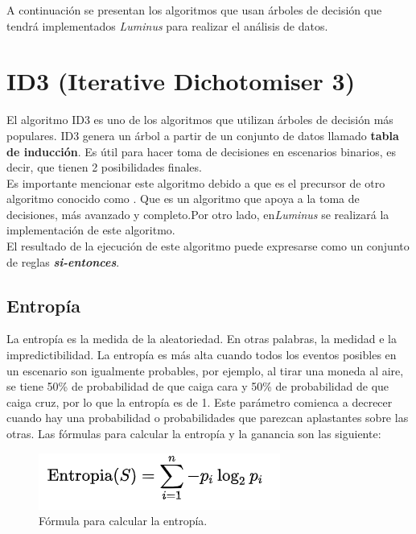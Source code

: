 A continuación se presentan los algoritmos que usan árboles de decisión que tendrá implementados \emph{Luminus} para realizar el análisis de datos.

\section{ID3 (Iterative Dichotomiser 3)} \label{id3}

El algoritmo ID3 es uno de los algoritmos que utilizan árboles de decisión más populares. ID3 genera un árbol a partir de un conjunto de datos llamado \textbf{tabla de inducción}. Es útil para hacer toma de decisiones en escenarios binarios, es decir, que tienen 2 posibilidades finales.\cite{id3}\\

Es importante mencionar este algoritmo debido a que es el precursor de otro algoritmo conocido como . Que es un algoritmo que apoya a la toma de decisiones, más avanzado y completo.Por otro lado, en\emph{Luminus} se realizará la implementación de este algoritmo.\\

El resultado de la ejecución de este algoritmo puede expresarse como un conjunto de reglas \textbf{\textit{si-entonces}}.\\

\subsection{Entropía}
La entropía es la medida de la aleatoriedad. En otras palabras, la medidad e la impredictibilidad. La entropía es más alta cuando todos los eventos posibles en un escenario son igualmente probables, por ejemplo, al tirar una moneda al aire, se tiene 50\% de probabilidad de que caiga cara y 50\% de probabilidad de que caiga cruz, por lo que la entropía es de 1. Este parámetro comienca a decrecer cuando hay una probabilidad o probabilidades que parezcan aplastantes sobre las otras. Las fórmulas para calcular la entropía y la ganancia son las siguiente:\\

\begin{figure}[!htbp]
	\hypertarget{fig:formula-entropia}{\hspace{1pt}}
	\begin{center}
		\includegraphics{capitulo2/images/formula-entropia.png}
		\caption{Fórmula para calcular la entropía.}
		\label{fig:formula-entropia}
	\end{center}
\end{figure}

